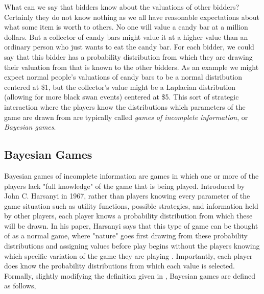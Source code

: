 \documentclass[12pt,twoside]{reedthesis}
\begin{document}
What can we say that bidders know about the valuations of other bidders? Certainly they do not know nothing as we all have reasonable expectations about what some item is worth to others. No one will value a candy bar at a million dollars. But a collector of candy bars might value it at a higher value than an ordinary person who just wants to eat the candy bar. For each bidder, we could say that this bidder has a probability distribution from which they are drawing their valuation from that is known to the other bidders. As an example we might expect normal people's valuations of candy bars to be a normal distribution centered at \$1, but the collector's value might be a Laplacian distribution (allowing for more black swan events) centered at \$5. This sort of strategic interaction where the players know the distributions which parameters of the game are drawn from are typically called {\em games of incomplete information}, or {\em Bayesian games}.
 
\subsection{Bayesian Games}
Bayesian games of incomplete information are games in which one or more of the players lack "full knowledge" of the game that is being played. Introduced by John C. Harsanyi in 1967, rather than players knowing every parameter of the game situation such as utility functions, possible strategies, and information held by other players, each player knows a probability distribution from which these will be drawn. In his paper, Harsanyi says that this type of game can be thought of as a normal game, where "nature" goes first drawing from these probability distributions and assigning values before play begins without the players knowing which specific variation of the game they are playing \citep{Harsanyi1967}.
 Importantly, each player does know the probability distributions from which each value is selected. Formally, slightly modifying the definition given in \citet{Nisan2007}, Bayesian games are defined as follows,
\end{document}
